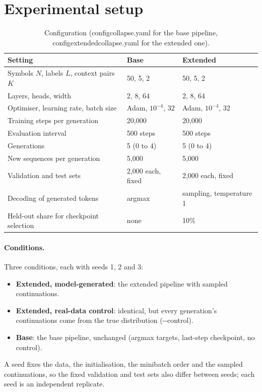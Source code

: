 \documentclass[11pt,a4paper]{article}
\DeclareRobustCommand{\code}[1]{\begingroup\ttfamily\def\_{\textunderscore\allowbreak}#1\endgroup}
\begin{document}
\section{Experimental setup}\label{sec:setup}

\begin{table}[htbp]
\centering
\small
\caption{Configuration (\code{config\_collapse.yaml} for the base pipeline,
\code{config\_extended\_collapse.yaml} for the extended one).}
\label{tab:config}
\begin{tabular}{lll}
\toprule
Setting & Base & Extended\\
\midrule
Symbols $N$, labels $L$, context pairs $K$ & 50, 5, 2 & 50, 5, 2\\
Layers, heads, width & 2, 8, 64 & 2, 8, 64\\
Optimiser, learning rate, batch size & Adam, $10^{-4}$, 32 & Adam, $10^{-4}$, 32\\
Training steps per generation & 20{,}000 & 20{,}000\\
Evaluation interval & 500 steps & 500 steps\\
Generations & 5 (0 to 4) & 5 (0 to 4)\\
New sequences per generation & 5{,}000 & 5{,}000\\
Validation and test sets & 2{,}000 each, fixed & 2{,}000 each, fixed\\
Decoding of generated tokens & argmax & sampling, temperature 1\\
Held-out share for checkpoint selection & none & 10\%\\
\bottomrule
\end{tabular}
\end{table}

\paragraph{Conditions.} Three conditions, each with seeds 1, 2 and 3:
\begin{itemize}[leftmargin=1.4em]
  \item \textbf{Extended, model-generated}: the extended pipeline with sampled
        continuations.
  \item \textbf{Extended, real-data control}: identical, but every
        generation's continuations come from the true distribution
        (\code{-{}-control}).
  \item \textbf{Base}: the base pipeline, unchanged (argmax targets, last-step
        checkpoint, no control).
\end{itemize}
A seed fixes the data, the initialisation, the minibatch order and the
sampled continuations, so the fixed validation and test sets also differ
between seeds; each seed is an independent replicate.
\end{document}
